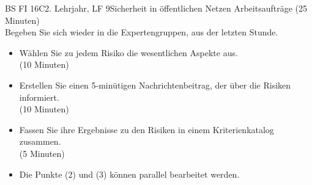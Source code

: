 \documentclass[oneside,openany,headings=optiontotoc,11pt,numbers=noenddot]{scrreprt}
\begin{document}
\begin{worksheet}{BS FI 16C}{2. Lehrjahr, LF 9}{Sicherheit in öffentlichen Netzen}
		\color{codegray}Arbeitsaufträge (25 Minuten)\\
		\color{black}
		Begeben Sie sich wieder in die Expertengruppen, aus der letzten Stunde.
		\begin{itemize}
			\item[(1)] Wählen Sie zu jedem Risiko die wesentlichen Aspekte aus.\\ (10 Minuten)
			\item[(2)]Erstellen Sie einen 5-minütigen Nachrichtenbeitrag, der über die Risiken informiert.\\(10 Minuten)
			\item[(3)] Fassen Sie ihre Ergebnisse zu den Risiken in einem Kriterienkatalog zusammen.\\ (5 Minuten)
			\item[] \tiny Die Punkte (2) und (3) können parallel bearbeitet werden.
		\end{itemize}
	\end{worksheet}
\end{document}
